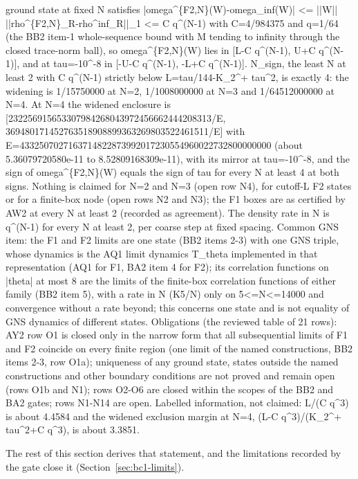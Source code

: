 \begin{gatequote}
ground state at fixed N satisfies
|omega\textasciicircum{}\{F2,N\}(W)-omega\_inf(W)| <= ||W||
||rho\textasciicircum{}\{F2,N\}\_R-rho\textasciicircum{}inf\_R||\_1 <=
C\textquotesingle{} q\textasciicircum{}(N-1) with C\textquotesingle{}=4/984375
and q=1/64 (the BB2 item-1 whole-sequence bound with M tending to infinity
through the closed trace-norm ball), so omega\textasciicircum{}\{F2,N\}(W)
lies in [L-C\textquotesingle{} q\textasciicircum{}(N-1), U+C\textquotesingle{}
q\textasciicircum{}(N-1)], and at tau=-10\textasciicircum{}-8 in
[-U-C\textquotesingle{} q\textasciicircum{}(N-1), -L+C\textquotesingle{}
q\textasciicircum{}(N-1)]. N\_sign, the least N at least 2 with
C\textquotesingle{} q\textasciicircum{}(N-1) strictly below
L=tau/144-K\_2\textasciicircum{}+ tau\textasciicircum{}2, is exactly 4: the
widening is 1/15750000 at N=2, 1/1008000000 at N=3 and 1/64512000000 at N=4.
At N=4 the widened enclosure is [232256915653307984268043972456662444208313/E,
369480171452763518908899363269803522461511/E] with
E=4332507027163714822873992017230554960022732800000000 (about
5.36079720580e-11 to 8.52809168309e-11), with its mirror at
tau=-10\textasciicircum{}-8, and the sign of
omega\textasciicircum{}\{F2,N\}(W) equals the sign of tau for every N at least
4 at both signs. Nothing is claimed for N=2 and N=3 (open row N4), for
cutoff-L F2 states or for a finite-box node (open rows N2 and N3); the F1
boxes are as certified by AW2 at every N at least 2 (recorded as agreement).
The density rate in N is q\textasciicircum{}(N-1) for every N at least 2, per
coarse step at fixed spacing. Common GNS item: the F1 and F2 limits are one
state (BB2 items 2-3) with one GNS triple, whose dynamics is the AQ1 limit
dynamics T\_theta implemented in that representation (AQ1 for F1, BA2 item 4
for F2); its correlation functions on |theta| at most 8 are the limits of the
finite-box correlation functions of either family (BB2 item 5), with a rate in
N (K5/N) only on 5<=N<=14000 and convergence without a rate beyond; this
concerns one state and is not equality of GNS dynamics of different states.
Obligations (the reviewed table of 21 rows): AY2 row O1 is closed only in the
narrow form that all subsequential limits of F1 and F2 coincide on every
finite region (one limit of the named constructions, BB2 items 2-3, row O1a);
uniqueness of any ground state, states outside the named constructions and
other boundary conditions are not proved and remain open (rows O1b and N1);
rows O2-O6 are closed within the scopes of the BB2 and BA2 gates; rows N1-N14
are open. Labelled information, not claimed: L/(C\textquotesingle{}
q\textasciicircum{}3) is about 4.4584 and the widened exclusion margin at N=4,
(L-C\textquotesingle{} q\textasciicircum{}3)/(K\_2\textasciicircum{}+
tau\textasciicircum{}2+C\textquotesingle{} q\textasciicircum{}3), is about
3.3851.
\end{gatequote}
The rest of this section derives that statement, and the limitations recorded
by the gate close it (Section~\ref{sec:bc1-limits}).

